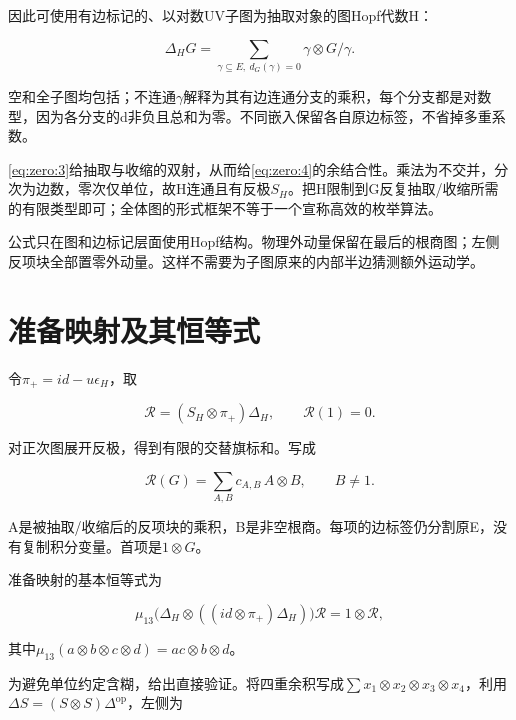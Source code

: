 \documentclass[11pt,a4paper,oneside]{ctexrep}
\theoremstyle{cnplain}
\theoremstyle{definition}
\theoremstyle{remark}
\begin{document}
因此可使用有边标记的、以对数UV子图为抽取对象的图Hopf代数H：

\begin{equation}
\Delta_H G=\sum_{\gamma\subseteq E,\ d_G(\gamma)=0}
                         \gamma\otimes G/\gamma.             \label{eq:zero:4}
\end{equation}

空和全子图均包括；不连通\(\gamma \)解释为其有边连通分支的乘积，每个分支都是对数型，因为各分支的d非负且总和为零。不同嵌入保留各自原边标签，不省掉多重系数。

\eqref{eq:zero:3}给抽取与收缩的双射，从而给\eqref{eq:zero:4}的余结合性。乘法为不交并，分次为边数，零次仅单位，故H连通且有反极\(S_H\)。把H限制到G反复抽取/收缩所需的有限类型即可；全体图的形式框架不等于一个宣称高效的枚举算法。

公式只在图和边标记层面使用Hopf结构。物理外动量保留在最后的根商图；左侧反项块全部置零外动量。这样不需要为子图原来的内部半边猜测额外运动学。

\section{准备映射及其恒等式}\label{sec:zero:3}

令\(\pi _+=id- u\epsilon _H\)，取

\begin{equation}
\mathcal R=(S_H\otimes\pi_+)\Delta_H,\qquad\mathcal R(1)=0.     \label{eq:zero:5}
\end{equation}

对正次图展开反极，得到有限的交替旗标和。写成

\begin{equation}
\mathcal R(G)=\sum_{A,B}c_{A,B}\,A\otimes B,\qquad B\ne1.      \label{eq:zero:6}
\end{equation}

A是被抽取/收缩后的反项块的乘积，B是非空根商。每项的边标签仍分割原E，没有复制积分变量。首项是\(1\otimes G\)。

准备映射的基本恒等式为

\begin{equation}
\mu_{13}\bigl(\Delta_H\otimes((id\otimes\pi_+)\Delta_H)\bigr)
           \mathcal R
       =1\otimes\mathcal R,                                  \label{eq:zero:7}
\end{equation}

其中\(\mu_{13}(a\otimes b\otimes c\otimes d)=ac\otimes b\otimes d\)。

为避免单位约定含糊，给出直接验证。将四重余积写成\(\sum x_1\otimes x_2\otimes x_3\otimes x_4\)，利用\(\Delta S=(S\otimes S)\Delta ^{\mathrm{op}}\)，左侧为
\end{document}
